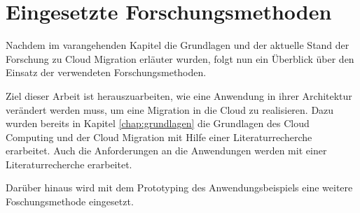 
\chapter{Eingesetzte Forschungsmethoden}

Nachdem im varangehenden Kapitel die Grundlagen und der aktuelle Stand der Forschung zu Cloud Migration erläuter wurden,
folgt nun ein Überblick über den Einsatz der verwendeten Forschungsmethoden.

Ziel dieser Arbeit ist herauszuarbeiten, wie eine Anwendung in ihrer Architektur verändert werden muss,
um eine Migration in die Cloud zu realisieren. Dazu wurden bereits in Kapitel \ref{chap:grundlagen} die Grundlagen des
Cloud Computing und der Cloud Migration mit Hilfe einer Literaturrecherche erarbeitet. Auch die Anforderungen an die
Anwendungen werden mit einer Literaturrecherche erarbeitet.

Darüber hinaus wird mit dem Prototyping des Anwendungsbeispiels eine weitere Foschungsmethode eingesetzt.


